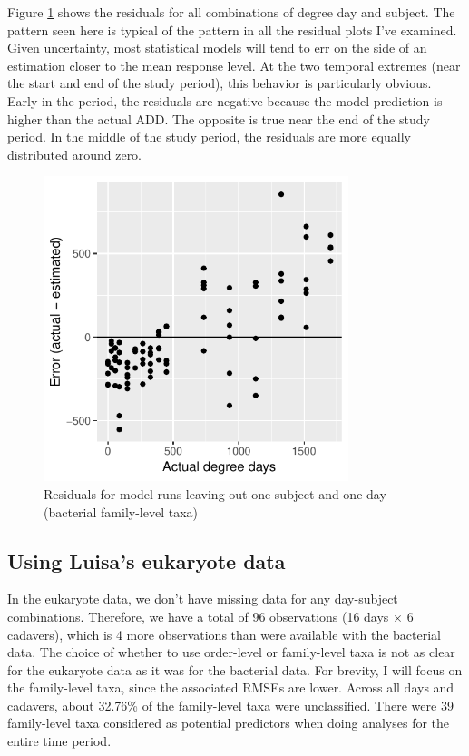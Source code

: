 \documentclass{article}
\begin{document}
Figure \ref{fig:leave_one_out_resids_bac_family_taxa} shows the
residuals for all combinations of degree day and subject.  The pattern
seen here is typical of the pattern in all the residual plots I've
examined.  Given uncertainty, most statistical models will tend to err
on the side of an estimation closer to the mean response level.  At
the two temporal extremes (near the start and end of the study
period), this behavior is particularly obvious.  Early in the period,
the residuals are negative because the model prediction is higher than
the actual ADD.  The opposite is true near the end of the study
period.  In the middle of the study period, the residuals are more
equally distributed around zero.
\begin{figure}
  \centering
  \includegraphics[width=3.5in]{../revise_algorithm/only_families/all_time_steps/hit_1perc_twice/leave_out_one_subj_and_one_day_residuals}
  \caption{Residuals for model runs leaving out one subject and one day (bacterial family-level taxa)}
  \label{fig:leave_one_out_resids_bac_family_taxa}
\end{figure}


\subsection{Using Luisa's eukaryote data}

In the eukaryote data, we don't have missing data for any day-subject
combinations.  Therefore, we have a total of 96 observations (16 days
$\times$ 6 cadavers), which is 4 more observations than were available
with the bacterial data.  The choice of whether to use order-level or
family-level taxa is not as clear for the eukaryote data as it was for
the bacterial data.  For brevity, I will focus on the family-level
taxa, since the associated RMSEs are lower.  Across all days and
cadavers, about 32.76\% of the family-level taxa were unclassified.
There were 39 family-level taxa considered as potential predictors
when doing analyses for the entire time period.
\end{document}
